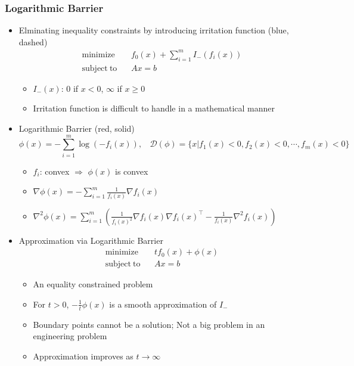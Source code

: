 \subsubsection*{Logarithmic Barrier}
\begin{itemize}
    \item Elminating inequality constraints by introducing irritation function (blue, dashed)
    \begin{equation}\begin{aligned}
        \mathrm{minimize}~~&~~f_0(x)+\sum_{i=1}^mI_-(f_i(x)) \\
        \mathrm{subject~to}~~&~~Ax=b
    \end{aligned}\end{equation}
    \begin{itemize}
        \item $I_-(x)$: $0$ if $x<0$, $\infty$ if $x\geq 0$
        \item Irritation function is difficult to handle in a mathematical manner
    \end{itemize}
    \item Logarithmic Barrier (red, solid)
    \begin{equation}
        \phi(x)=-\sum_{i=1}^m\log(-f_i(x)),~~~~\mathcal{D}(\phi)=\{x|f_1(x)<0,f_2(x)<0,\cdots,f_m(x)<0\}
    \end{equation}
    \begin{itemize}
        \item $f_i$: convex $\Rightarrow$ $\phi(x)$ is convex
        \item $\nabla\phi(x)=-\sum_{i=1}^{m}\frac{1}{f_i(x)}\nabla f_i(x)$
        \item $\nabla^2\phi(x)=\sum_{i=1}^{m}\left(\frac{1}{f_i(x)^2}\nabla f_i(x)\nabla f_i(x)^{\top}-\frac{1}{f_i(x)}\nabla^2f_i(x)\right)$
    \end{itemize}
    \item Approximation via Logarithmic Barrier
    \begin{equation}\begin{aligned}
        \mathrm{minimize}~~&~~tf_0(x)+\phi(x) \\
        \mathrm{subject~to}~~&~~Ax=b
    \end{aligned}\end{equation}
    \begin{itemize}
        \item An equality constrained problem
        \item For $t>0$, $-\frac{1}{t}\phi(x)$ is a smooth approximation of $I_-$
        \item Boundary points cannot be a solution; Not a big problem in an engineering problem
        \item Approximation improves as $t\rightarrow\infty$
    \end{itemize}
    \begin{figures}
    \end{figures}
\end{itemize}

